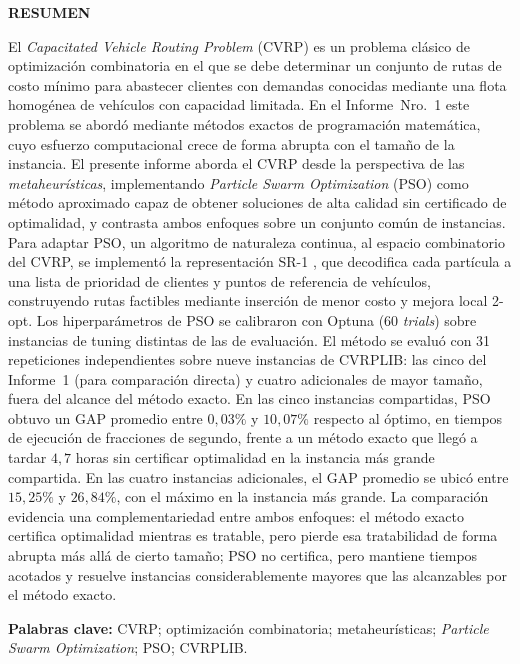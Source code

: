\clearpage
\thispagestyle{empty}
\begin{center}
    \bfseries\fontsize{14}{16}\selectfont RESUMEN
\end{center}
\vspace{16pt}

\noindent
El \textit{Capacitated Vehicle Routing Problem} (CVRP) es un problema clásico de
optimización combinatoria en el que se debe determinar un conjunto de rutas de costo
mínimo para abastecer clientes con demandas conocidas mediante una flota homogénea de
vehículos con capacidad limitada. En el Informe~Nro.~1 este problema se abordó mediante
métodos exactos de programación matemática, cuyo esfuerzo computacional crece de forma
abrupta con el tamaño de la instancia. El presente informe aborda el CVRP desde la
perspectiva de las \textit{metaheurísticas}, implementando \textit{Particle Swarm
Optimization} (PSO) como método aproximado capaz de obtener soluciones de alta calidad
sin certificado de optimalidad, y contrasta ambos enfoques sobre un conjunto común de
instancias. Para adaptar PSO, un algoritmo de naturaleza continua, al espacio combinatorio
del CVRP, se implementó la representación SR-1 \parencite{ai2009particle}, que decodifica
cada partícula a una lista de prioridad de clientes y puntos de referencia de vehículos,
construyendo rutas factibles mediante inserción de menor costo y mejora local 2-opt. Los
hiperparámetros de PSO se calibraron con Optuna (60 \textit{trials}) sobre instancias de
tuning distintas de las de evaluación. El método se evaluó con 31 repeticiones
independientes sobre nueve instancias de CVRPLIB: las cinco del Informe~1 (para
comparación directa) y cuatro adicionales de mayor tamaño, fuera del alcance del método
exacto. En las cinco instancias compartidas, PSO obtuvo un GAP promedio entre $0{,}03\%$
y $10{,}07\%$ respecto al óptimo, en tiempos de ejecución de fracciones de segundo,
frente a un método exacto que llegó a tardar $4{,}7$ horas sin certificar optimalidad en la
instancia más grande compartida. En las cuatro instancias adicionales, el GAP promedio
se ubicó entre $15{,}25\%$ y $26{,}84\%$, con el máximo en la instancia más grande. La
comparación evidencia una
complementariedad entre ambos enfoques: el método exacto certifica optimalidad mientras
es tratable, pero pierde esa tratabilidad de forma abrupta más allá de cierto tamaño;
PSO no certifica, pero mantiene tiempos acotados y resuelve instancias considerablemente
mayores que las alcanzables por el método exacto.

\vspace{10pt}
\noindent\textbf{Palabras clave:} CVRP; optimización combinatoria; metaheurísticas;
\textit{Particle Swarm Optimization}; PSO; CVRPLIB.
